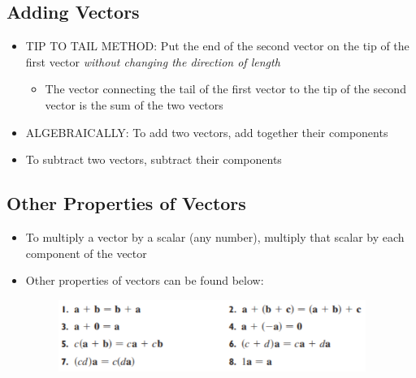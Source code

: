 \documentclass{package/notes}
\begin{document}
\subsection{Adding Vectors}
	\begin{itemize}
		\item TIP TO TAIL METHOD: Put the end of the second vector on the tip of the first vector \textit{without changing the direction of length}
		\begin{itemize}
			\item The vector connecting the tail of the first vector to the tip of the second vector is the sum of the two vectors
		\end{itemize}
		\item ALGEBRAICALLY: To add two vectors, add together their components
		\item To subtract two vectors, subtract their components
	\end{itemize}

\subsection{Other Properties of Vectors}
	\begin{itemize}
		\item To multiply a vector by a scalar (any number), multiply that scalar by each component of the vector
		\item Other properties of vectors can be found below: 
	
		\begin{figure}[h]
			\begin{center}
				\includegraphics[width=10cm]{images/1.2.1_Image.PNG}
			\end{center}
		\end{figure}
	\end{itemize}
\end{document}
